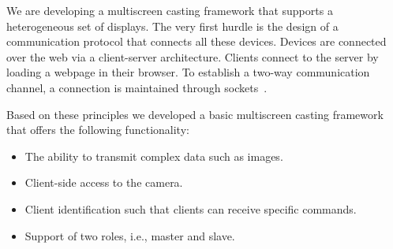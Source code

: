 \documentclass[a4paper,11pt]{article}
\newcommand{\exampletext}[1]{{\color{blue!60!black}#1}}
\begin{document}
\exampletext{
We are developing a multiscreen casting framework that supports a heterogeneous set of displays. The very first hurdle is the design of a communication protocol that connects all these devices. Devices are connected over the web via a client-server architecture. Clients connect to the server by loading a webpage in their browser. To establish a two-way communication channel, a connection is maintained through sockets~\cite{socketio}.

Based on these principles we developed a basic multiscreen casting framework that offers the following functionality:
\begin{itemize}
    \item The ability to transmit complex data such as images.
    \item Client-side access to the camera.
    \item Client identification such that clients can receive specific commands.
    \item Support of two roles, i.e., master and slave.
\end{itemize}

}
\end{document}
